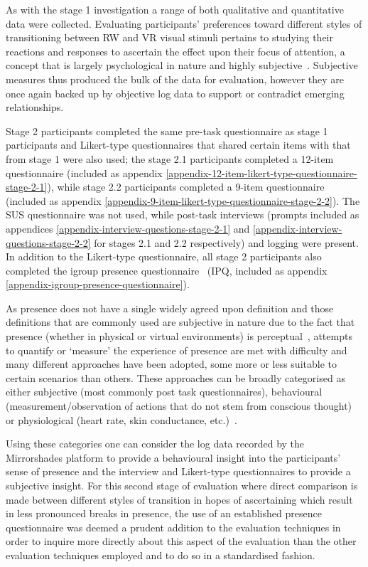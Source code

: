 As with the stage 1 investigation a range of both qualitative and quantitative data were collected. Evaluating participants' preferences toward different styles of transitioning between RW and VR visual stimuli pertains to studying their reactions and responses to ascertain the effect upon their focus of attention, a concept that is largely psychological in nature and highly subjective~\cite{Ijsselsteijn2001}. Subjective measures thus produced the bulk of the data for evaluation, however they are once again backed up by objective log data to support or contradict emerging relationships.

Stage 2 participants completed the same pre-task questionnaire as stage 1 participants and Likert-type questionnaires that shared certain items with that from stage 1 were also used; the stage 2.1 participants completed a 12-item questionnaire (included as appendix \ref{appendix-12-item-likert-type-questionnaire-stage-2-1}), while stage 2.2 participants completed a 9-item questionnaire (included as appendix \ref{appendix-9-item-likert-type-questionnaire-stage-2-2}). The SUS questionnaire was not used, while post-task interviews (prompts included as appendices \ref{appendix-interview-questions-stage-2-1} and \ref{appendix-interview-questions-stage-2-2} for stages 2.1 and 2.2 respectively) and logging were present. In addition to the Likert-type questionnaire, all stage 2 participants also completed the igroup presence questionnaire~\cite{Schubert2001} (IPQ, included as appendix \ref{appendix-igroup-presence-questionnaire}).

As presence does not have a single widely agreed upon definition and those definitions that are commonly used are subjective in nature due to the fact that presence (whether in physical or virtual environments) is perceptual~\cite{Waterworth2014}, attempts to quantify or `measure' the experience of presence are met with difficulty and many different approaches have been adopted, some more or less suitable to certain scenarios than others. These approaches can be broadly categorised as either subjective (most commonly post task questionnaires), behavioural (measurement/observation of actions that do not stem from conscious thought) or physiological (heart rate, skin conductance, etc.)~\cite{Insko2003}.

Using these categories one can consider the log data recorded by the Mirrorshades platform to provide a behavioural insight into the participants' sense of presence and the interview and Likert-type questionnaires to provide a subjective insight. For this second stage of evaluation where direct comparison is made between different styles of transition in hopes of ascertaining which result in less pronounced breaks in presence, the use of an established presence questionnaire was deemed a prudent addition to the evaluation techniques in order to inquire more directly about this aspect of the evaluation than the other evaluation techniques employed and to do so in a standardised fashion.

